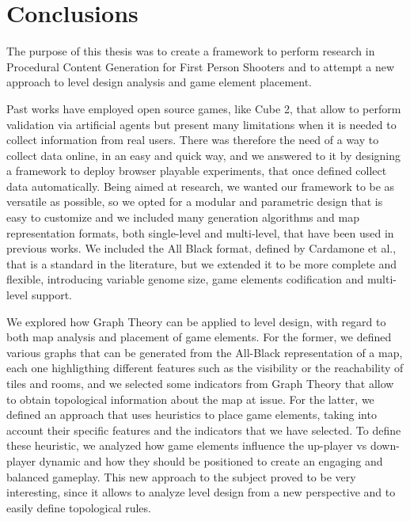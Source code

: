 \chapter{Conclusions}


The purpose of this thesis was to create a framework to perform research in Procedural Content Generation for First Person Shooters and to attempt a new approach to level design analysis and game element placement. 

\par

Past works have employed open source games, like Cube 2, that allow to perform validation via artificial agents but present many limitations when it is needed to collect information from real users. There was therefore the need of a way to collect data online, in an easy and quick way, and we answered to it by designing a framework to deploy browser playable experiments, that once defined collect data automatically. Being aimed at research, we wanted our framework to be as versatile as possible, so we opted for a modular and parametric design that is easy to customize and we included many generation algorithms and map representation formats, both single-level and multi-level, that have been used in previous works. We included the All Black format, defined by Cardamone et al.\cite{Cardamone:2011:EIM:2008402.2008411}, that is a standard in the literature, but we extended it to be more complete and flexible, introducing variable genome size, game elements codification and multi-level support.

\par

We explored how Graph Theory can be applied to level design, with regard to both map analysis and placement of game elements. For the former, we defined various graphs that can be generated from the All-Black representation of a map, each one highligthing different features such as the visibility or the reachability of tiles and rooms, and we selected some indicators from Graph Theory that allow to obtain topological information about the map at issue. For the latter, we defined an approach that uses heuristics to place game elements, taking into account their specific features and the indicators that we have selected. To define these heuristic, we analyzed how game elements influence the up-player vs down-player dynamic and how they should be positioned to create an engaging and balanced gameplay. This new approach to the subject proved to be very interesting, since it allows to analyze level design from a new perspective and to easily define topological rules.

